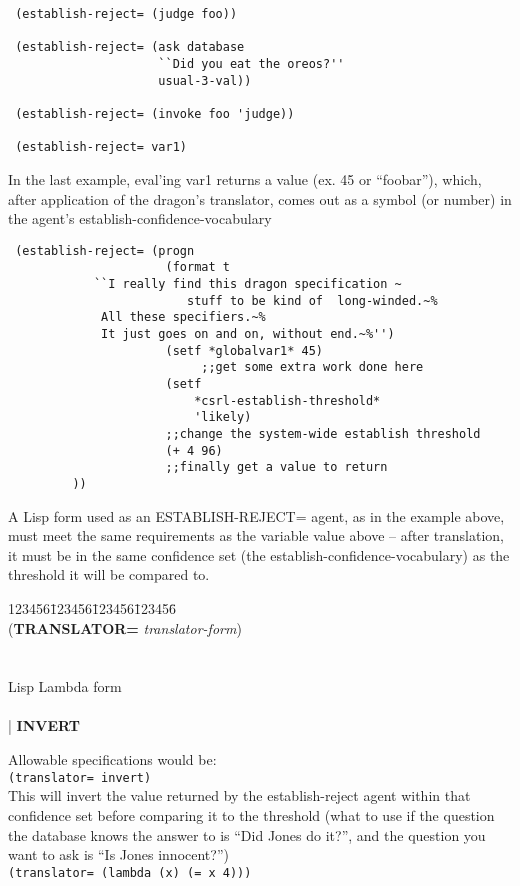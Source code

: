 \begin{verbatim}
 (establish-reject= (judge foo))

 (establish-reject= (ask database 
                     ``Did you eat the oreos?''
                     usual-3-val))

 (establish-reject= (invoke foo 'judge))

 (establish-reject= var1)
\end{verbatim}

In the last example, eval'ing var1 returns a value
(ex. 45 or ``foobar''),	which, after application of the dragon's
translator, comes out as a symbol (or number) in the agent's
establish-confidence-vocabulary

\begin{verbatim}
 (establish-reject= (progn 
                      (format t 
			``I really find this dragon specification ~
                         stuff to be kind of  long-winded.~% 
			 All these specifiers.~% 
			 It just goes on and on, without end.~%'')
                      (setf *globalvar1* 45) 
                           ;;get some extra work done here 
                      (setf 
                          *csrl-establish-threshold*
                          'likely)
                      ;;change the system-wide establish threshold
                      (+ 4 96) 
                      ;;finally get a value to return
		 ))

\end{verbatim}
A Lisp form used as an ESTABLISH-REJECT= agent, as in the example
above, must meet the same requirements as the variable value above --
after translation, it must be in the same confidence set (the
establish-confidence-vocabulary) as the threshold it will be compared
to.



\begin{tabbing}
123456\=123456\=123456\=123456\= \kill
\\
({\bf TRANSLATOR=} {\it translator-form}) \\
\\
 \\
\>\>\>\>Lisp Lambda form \\
\\
\>\>\>\>| {\bf INVERT}\\  
\end{tabbing}
Allowable specifications would be:
\\[10pt]
\verb$(translator= invert)$
\\
This will invert the value returned by the establish-reject agent
within that confidence set before comparing it to the threshold (what
to use if the question the database knows the answer to is ``Did Jones
do it?'', and the question you want to ask is ``Is Jones innocent?'')
\\[10pt]
\verb$(translator= (lambda (x) (= x 4)))$
\\

